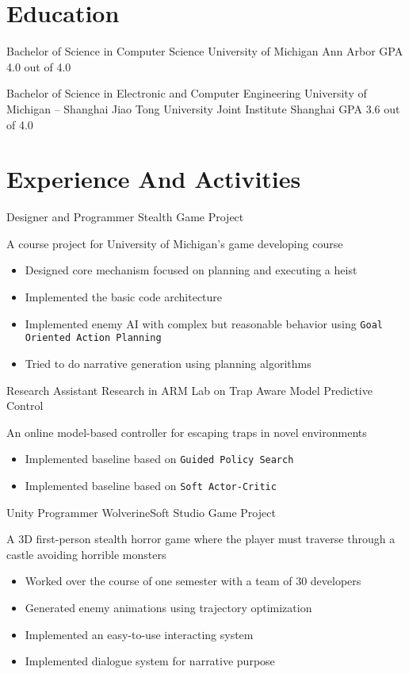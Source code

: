 \documentclass[10pt, a4paper, sans]{moderncv}
\begin{document}
\makecvtitle

\section{Education}
{Bachelor of Science in Computer Science}
{University of Michigan}
{Ann Arbor}
{GPA 4.0 out of 4.0}
{}

{Bachelor of Science in Electronic and Computer Engineering}
{University of Michigan -- Shanghai Jiao Tong University Joint Institute}
{Shanghai}
{GPA 3.6 out of 4.0}
{}

\section{Experience And Activities}
{Designer and Programmer}
{Stealth Game Project}
{}{}
{A course project for University of Michigan's game developing course
	\begin{itemize}
		\item Designed core mechanism focused on planning and executing a heist
		\item Implemented the basic code architecture
		\item Implemented enemy AI with complex but reasonable behavior using \texttt{Goal Oriented Action Planning}
		\item Tried to do narrative generation using planning algorithms
	\end{itemize}
}

{Research Assistant}
{Research in ARM Lab on Trap Aware Model Predictive Control}
{}{}
{An online model-based controller for escaping traps in novel environments
	\begin{itemize}
		\item Implemented baseline based on \texttt{Guided Policy Search}
		\item Implemented baseline based on \texttt{Soft Actor-Critic}
	\end{itemize}
}

{Unity Programmer}
{WolverineSoft Studio Game Project}
{}{}
{A 3D first-person stealth horror game where the player must traverse through a castle avoiding horrible monsters
	\begin{itemize}
		\item Worked over the course of one semester with a team of 30 developers
		\item Generated enemy animations using trajectory optimization
		\item Implemented an easy-to-use interacting system
		\item Implemented dialogue system for narrative purpose
	\end{itemize}
}
\end{document}

